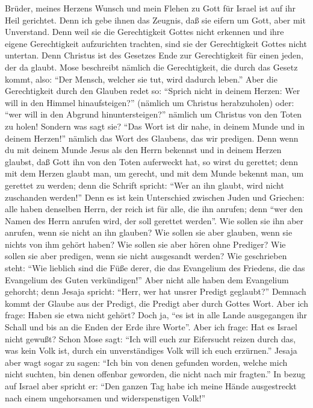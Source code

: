  Brüder, meines Herzens Wunsch und mein Flehen zu Gott für
Israel ist auf ihr Heil gerichtet.  Denn ich gebe ihnen
das Zeugnis, daß sie eifern um Gott, aber mit Unverstand. 
Denn weil sie die Gerechtigkeit Gottes nicht erkennen und ihre eigene
Gerechtigkeit aufzurichten trachten, sind sie der Gerechtigkeit Gottes
nicht untertan.  Denn Christus ist des Gesetzes Ende zur
Gerechtigkeit für einen jeden, der da glaubt.  Mose
beschreibt nämlich die Gerechtigkeit, die durch das Gesetz kommt, also:
``Der Mensch, welcher sie tut, wird dadurch leben.''  Aber
die Gerechtigkeit durch den Glauben redet so: ``Sprich nicht in deinem
Herzen: Wer will in den Himmel hinaufsteigen?'' (nämlich um Christus
herabzuholen)  oder: ``wer will in den Abgrund
hinuntersteigen?'' nämlich um Christus von den Toten zu holen!
 Sondern was sagt sie? ``Das Wort ist dir nahe, in deinem
Munde und in deinem Herzen!'' nämlich das Wort des Glaubens, das wir
predigen.  Denn wenn du mit deinem Munde Jesus als den
Herrn bekennst und in deinem Herzen glaubst, daß Gott ihn von den Toten
auferweckt hat, so wirst du gerettet;  denn mit dem
Herzen glaubt man, um gerecht, und mit dem Munde bekennt man, um
gerettet zu werden;  denn die Schrift spricht: ``Wer an
ihn glaubt, wird nicht zuschanden werden!''  Denn es ist
kein Unterschied zwischen Juden und Griechen: alle haben denselben
Herrn, der reich ist für alle, die ihn anrufen;  denn
``wer den Namen des Herrn anrufen wird, der soll gerettet werden''.
 Wie sollen sie ihn aber anrufen, wenn sie nicht an ihn
glauben? Wie sollen sie aber glauben, wenn sie nichts von ihm gehört
haben? Wie sollen sie aber hören ohne Prediger?  Wie
sollen sie aber predigen, wenn sie nicht ausgesandt werden? Wie
geschrieben steht: ``Wie lieblich sind die Füße derer, die das
Evangelium des Friedens, die das Evangelium des Guten verkündigen!''
 Aber nicht alle haben dem Evangelium gehorcht; denn
Jesaja spricht: ``Herr, wer hat unsrer Predigt geglaubt?''
 Demnach kommt der Glaube aus der Predigt, die Predigt
aber durch Gottes Wort.  Aber ich frage: Haben sie etwa
nicht gehört? Doch ja, ``es ist in alle Lande ausgegangen ihr Schall und
bis an die Enden der Erde ihre Worte''.  Aber ich frage:
Hat es Israel nicht gewußt? Schon Mose sagt: ``Ich will euch zur
Eifersucht reizen durch das, was kein Volk ist, durch ein unverständiges
Volk will ich euch erzürnen.''  Jesaja aber wagt sogar zu
sagen: ``Ich bin von denen gefunden worden, welche mich nicht suchten,
bin denen offenbar geworden, die nicht nach mir fragten.''
 In bezug auf Israel aber spricht er: ``Den ganzen Tag
habe ich meine Hände ausgestreckt nach einem ungehorsamen und
widerspenstigen Volk!''

